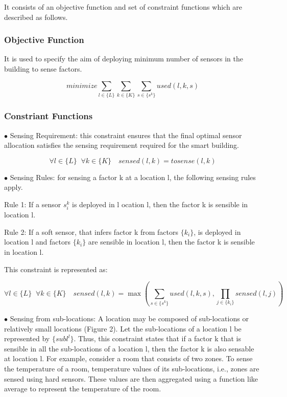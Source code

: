 \documentclass[]{interact}
\theoremstyle{plain}%
\theoremstyle{definition}
\theoremstyle{remark}
\begin{document}
It consists of an objective function and set of constraint functions which are described as follows.

\subsubsection{Objective Function}

It is used to specify the aim of deploying minimum number of sensors in the building to sense factors.

\begin{equation}
  minimize \sum_{l \in \{L\}} \sum_{k \in \{K\}} \sum_{s \in \{s^k\}}  used(l,k,s)
\end{equation}

\subsubsection{Constriant Functions}

\noindent $\bullet$ Sensing Requirement: this constraint ensures that the final optimal sensor allocation satisfies the sensing requirement required for the smart building.

\begin{equation}
  \forall l \in \{L\} \;\; \forall k \in \{K\} \quad sensed(l,k) = tosense(l,k)
\end{equation}

\noindent $\bullet$ Sensing Rules: for sensing a factor k at a location l, the following sensing rules apply.

  Rule 1: If a sensor $s_i^k$ is deployed in l	ocation l, then the factor k is sensible in location l.

	Rule 2: If a soft sensor, that infers factor k from factors $\{k_i\}$, is deployed in location l
and factors $\{k_i\}$ are sensible in location l, then the factor k is sensible in location l.

\noindent This constraint is represented as:

\begin{equation}
  \forall l \in \{L\} \;\; \forall k \in \{K\} \quad sensed(l,k) = \max \left(
  \sum_{s \in \{s^k\}}  used(l,k,s) , 
  \prod_{j \in \{k_i\}} sensed(l,j)
  \right)
  \end{equation}

  \noindent $\bullet$ Sensing from sub-locations: A location may be composed of sub-locations or relatively small locations (Figure 2). Let the sub-locations of a location l be represented by $\{subl^l\}$. Thus, this constraint states that if a factor k that is sensible in all the sub-locations of a location l, then the factor k is also sensable at location l. For example, consider a room that consists of two zones. To sense the temperature of a room, temperature values of its sub-locations, i.e., zones are sensed using hard sensors. These values are then aggregated using a function like average to represent the temperature of the room.
\end{document}
